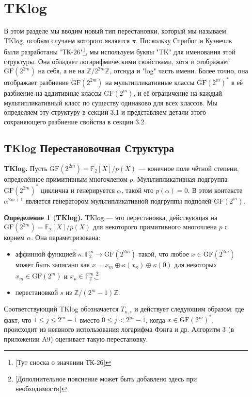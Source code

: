 \section{TKlog}

В этом разделе мы вводим новый тип перестановки, который мы называем TKlog, особым случаем которого является \(\pi\). Поскольку Стрибог и Кузнечик были разработаны "ТК-26"\footnote{[Тут сноска о значении ТК-26]}, мы используем буквы "TK" для именования этой структуры. Она обладает логарифмическими свойствами, хотя и отображает \(\mathrm{GF}(2^{2m})\) на себя, а не на \(\mathbb{Z}/2^{2m}\mathbb{Z}\), отсюда и "log" часть имени. Более точно, она отображает разбиение \(\mathrm{GF}(2^{2m})\) на мультипликативные классы \(\mathrm{GF}(2^m)^*\) в её разбиение на аддитивные классы \(\mathrm{GF}(2^m)\), и её ограничение на каждый мультипликативный класс по существу одинаково для всех классов. Мы определяем эту структуру в секции 3.1 и представляем детали этого сохраняющего разбиение свойства в секции 3.2.

\subsection{TKlog Перестановочная Структура}

\textbf{TKlog.} Пусть \(\mathrm{GF}(2^{2m}) = \mathbb{F}_2[X]/p(X)\) — конечное поле чётной степени, определённое примитивным многочленом \(p\). Мультипликативная подгруппа \(\mathrm{GF}(2^{2m})^*\) циклична и генерируется \(\alpha\), такой что \(p(\alpha) = 0\). В этом контексте \(\alpha^{2m+1}\) является генератором мультипликативной подгруппы подполей \(\mathrm{GF}(2^m)\).

\textbf{Определение 1 (TKlog).} TKlog — это перестановка, действующая на \(\mathrm{GF}(2^{2m}) = \mathbb{F}_2[X]/p(X)\) для некоторого примитивного многочлена \(p\) с корнем \(\alpha\). Она параметризована:
\begin{itemize}
    \item аффинной функцией \(\kappa : \mathbb{F}^m_2 \to \mathrm{GF}(2^{2m})\) такой, что любое \(x \in \mathrm{GF}(2^{2m})\) может быть записано как \(x = x_m \oplus \kappa(x_\kappa) \oplus \kappa(0)\) для некоторых \(x_m \in \mathrm{GF}(2^m)\) и \(x_\kappa \in \mathbb{F}^m_2\),\footnote{[Дополнительное пояснение может быть добавлено здесь при необходимости]}
    \item перестановкой \(s\) из \(\mathbb{Z}/(2^m - 1)\mathbb{Z}\).
\end{itemize}
Соответствующий TKlog обозначается \(T_{\kappa,s}\) и действует следующим образом:
где факт, что \(1 \leq j \leq 2^m - 1\) вместо \(0 \leq j < 2^m - 1\), когда \(x \in \mathrm{GF}(2^m)^*\), происходит из неявного использования логарифма Фэнга и др. Алгоритм 3 (в приложении A9) оценивает такую перестановку.